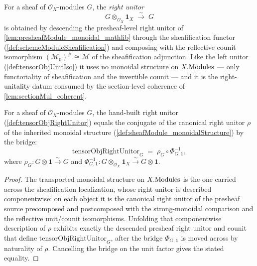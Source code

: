 \begin{definition}

  \label{def:tensorObjRightUnitor}
  For a sheaf of \(\mathcal{O}_X\)-modules \(G\), the \emph{right unitor}
  \[
    G \otimes_{\mathcal{O}_X} \mathbf{1}_X \;\xrightarrow{\ \sim\ }\; G
  \]
  is obtained by descending the presheaf-level right unitor of
  \cref{lem:presheafModule_monoidal_mathlib} through the sheafification functor
  (\cref{def:schemeModuleSheafification}) and composing with the reflective counit
  isomorphism \((\mathcal{M}_0)^{\#} \cong \mathcal{M}\) of the sheafification
  adjunction. Like the left unitor (\cref{def:tensorObjUnitIso}) it uses no
  monoidal structure on \(X.\mathrm{Modules}\) --- only functoriality of sheafification
  and the invertible counit --- and it is the right-unitality datum consumed by
  the section-level coherence of \cref{lem:sectionMul_coherent}.
\end{definition}

\begin{lemma}

  \label{lem:tensorObjRightUnitor_eq}
  For a sheaf of \(\mathcal{O}_X\)-modules \(G\), the hand-built right unitor
  (\cref{def:tensorObjRightUnitor}) equals the conjugate of the canonical right
  unitor \(\rho\) of the inherited monoidal structure
  (\cref{def:sheafModule_monoidalStructure}) by the bridge:
  \[
    \mathrm{tensorObjRightUnitor}_G
      \;=\; \rho_G \circ \Phi_{G,\mathbf{1}}^{-1},
  \]
  where \(\rho_G : G \otimes \mathbf{1} \xrightarrow{\sim} G\) and
  \(\Phi_{G,\mathbf{1}}^{-1} : G \otimes_{\mathcal{O}_X} \mathbf{1}_X
  \xrightarrow{\sim} G \otimes \mathbf{1}\).
\end{lemma}

\begin{proof}
  \leanok
  The transported monoidal structure on \(X.\mathrm{Modules}\) is the one carried across
  the sheafification localization, whose right unitor is described componentwise:
  on each object it is the canonical right unitor of the presheaf source
  precomposed and postcomposed with the strong-monoidal comparison and the
  reflective unit/counit isomorphisms. Unfolding that componentwise description of
  \(\rho\) exhibits exactly the descended presheaf right unitor and counit that
  define \(\mathrm{tensorObjRightUnitor}_G\), after the bridge
  \(\Phi_{G,\mathbf{1}}\) is moved across by naturality of \(\rho\). Cancelling the
  bridge on the unit factor gives the stated equality.
\end{proof}

